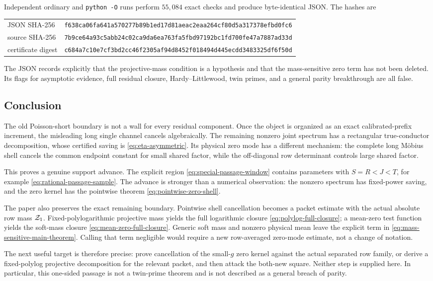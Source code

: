 Independent ordinary and \texttt{python -O} runs perform \(55{,}084\)
exact checks and produce byte-identical JSON.  The hashes are
\begin{center}
\scriptsize
\begin{tabular}{@{}ll@{}}
\toprule
JSON SHA-256
&\nolinkurl{f638ca06fa641a570277b89b1ed17d81aeac2eaa264cf80d5a317378efbd0fc6}\\
source SHA-256
&\nolinkurl{7b9ce64a93c5abb24c02ca9da6ea763fa5fbd97192bc1fd700fe47a7887ad33d}\\
certificate digest
&\nolinkurl{c684a7c10e7cf3bd2cc46f2305af94d8452f018494d445ecdd3483325df6f50d}\\
\bottomrule
\end{tabular}
\end{center}
The JSON records explicitly that the projective-mass condition is a
hypothesis and that the mass-sensitive zero term has not been deleted.
Its flags for asymptotic evidence, full residual closure,
Hardy--Littlewood, twin primes, and a general parity breakthrough are
all false.

\subsection{Conclusion}

The old Poisson-short boundary is not a wall for every residual
component.  Once the object is organized as an exact calibrated-prefix
increment, the misleading long single channel cancels algebraically.
The remaining nonzero joint spectrum has a rectangular true-conductor
decomposition, whose certified saving is
\eqref{eq:eta-asymmetric}.  Its physical zero mode has a different
mechanism: the complete long M\"obius shell cancels the common endpoint
constant for small shared factor, while the off-diagonal row
determinant controls large shared factor.

This proves a genuine support advance.  The explicit region
\eqref{eq:special-passage-window} contains parameters with
\(S=R<J<T\), for example \eqref{eq:rational-passage-sample}.  The
advance is stronger than a numerical observation: the nonzero spectrum
has fixed-power saving, and the zero kernel has the pointwise theorem
\eqref{eq:pointwise-zero-shell}.

The paper also preserves the exact remaining boundary.  Pointwise
shell cancellation becomes a packet estimate with the actual absolute
row mass \(\mathcal Z_1\).  Fixed-polylogarithmic projective mass yields the
full logarithmic closure \eqref{eq:polylog-full-closure}; a mean-zero
test function yields the soft-mass closure
\eqref{eq:mean-zero-full-closure}.  Generic soft mass and nonzero
physical mean leave the explicit term in
\eqref{eq:mass-sensitive-main-theorem}.  Calling that term negligible
would require a new row-averaged zero-mode estimate, not a change of
notation.

The next useful target is therefore precise: prove cancellation of the
small-\(g\) zero kernel against the actual separated row family, or
derive a fixed-polylog projective decomposition for the relevant
packet, and then attack the both-new square.  Neither step is supplied
here.  In particular, this one-sided passage is not a twin-prime
theorem and is not described as a general breach of parity.
